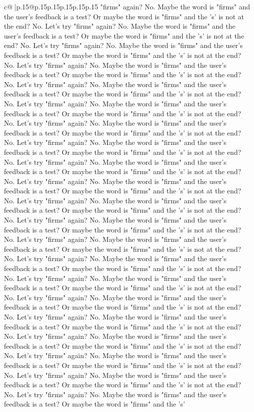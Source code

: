 \documentclass{article}
\begin{document}
{\begin{supertabular}{c@{$\;$}|p{.15\linewidth}@{}p{.15\linewidth}p{.15\linewidth}p{.15\linewidth}p{.15\linewidth}p{.15\linewidth}}
{{{"firms" again? No. Maybe the word is "firms" and the user's feedback is a test? Or maybe the word is "firms" and the 's' is not at the end? No. Let's try "firms" again? No. Maybe the word is "firms" and the user's feedback is a test? Or maybe the word is "firms" and the 's' is not at the end? No. Let's try "firms" again? No. Maybe the word is "firms" and the user's feedback is a test? Or maybe the word is "firms" and the 's' is not at the end? No. Let's try "firms" again? No. Maybe the word is "firms" and the user's feedback is a test? Or maybe the word is "firms" and the 's' is not at the end? No. Let's try "firms" again? No. Maybe the word is "firms" and the user's feedback is a test? Or maybe the word is "firms" and the 's' is not at the end? No. Let's try "firms" again? No. Maybe the word is "firms" and the user's feedback is a test? Or maybe the word is "firms" and the 's' is not at the end? No. Let's try "firms" again? No. Maybe the word is "firms" and the user's feedback is a test? Or maybe the word is "firms" and the 's' is not at the end? No. Let's try "firms" again? No. Maybe the word is "firms" and the user's feedback is a test? Or maybe the word is "firms" and the 's' is not at the end? No. Let's try "firms" again? No. Maybe the word is "firms" and the user's feedback is a test? Or maybe the word is "firms" and the 's' is not at the end? No. Let's try "firms" again? No. Maybe the word is "firms" and the user's feedback is a test? Or maybe the word is "firms" and the 's' is not at the end? No. Let's try "firms" again? No. Maybe the word is "firms" and the user's feedback is a test? Or maybe the word is "firms" and the 's' is not at the end? No. Let's try "firms" again? No. Maybe the word is "firms" and the user's feedback is a test? Or maybe the word is "firms" and the 's' is not at the end? No. Let's try "firms" again? No. Maybe the word is "firms" and the user's feedback is a test? Or maybe the word is "firms" and the 's' is not at the end? No. Let's try "firms" again? No. Maybe the word is "firms" and the user's feedback is a test? Or maybe the word is "firms" and the 's' is not at the end? No. Let's try "firms" again? No. Maybe the word is "firms" and the user's feedback is a test? Or maybe the word is "firms" and the 's' is not at the end? No. Let's try "firms" again? No. Maybe the word is "firms" and the user's feedback is a test? Or maybe the word is "firms" and the 's' is not at the end? No. Let's try "firms" again? No. Maybe the word is "firms" and the user's feedback is a test? Or maybe the word is "firms" and the 's' is not at the end? No. Let's try "firms" again? No. Maybe the word is "firms" and the user's feedback is a test? Or maybe the word is "firms" and the 's' is not at the end? No. Let's try "firms" again? No. Maybe the word is "firms" and the user's feedback is a test? Or maybe the word is "firms" and the 's' is not at the end? No. Let's try "firms" again? No. Maybe the word is "firms" and the user's feedback is a test? Or maybe the word is "firms" and the 's' is not at the end? No. Let's try "firms" again? No. Maybe the word is "firms" and the user's feedback is a test? Or maybe the word is "firms" and the 's' }}}
\end{supertabular}}
\end{document}
